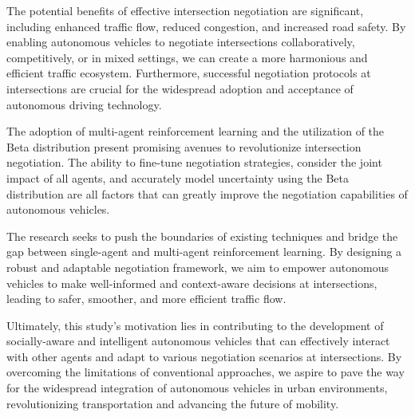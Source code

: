 The potential benefits of effective intersection negotiation are significant, including enhanced traffic flow, reduced congestion, and increased road safety.
By enabling autonomous vehicles to negotiate intersections collaboratively, competitively, or in mixed settings, we can create a more harmonious and efficient traffic ecosystem.
Furthermore, successful negotiation protocols at intersections are crucial for the widespread adoption and acceptance of autonomous driving technology.

The adoption of multi-agent reinforcement learning and the utilization of the Beta distribution present promising avenues to revolutionize intersection negotiation.
The ability to fine-tune negotiation strategies, consider the joint impact of all agents, and accurately model uncertainty using the Beta distribution are all factors that can greatly improve the negotiation capabilities of autonomous vehicles.

The research seeks to push the boundaries of existing techniques and bridge the gap between single-agent and multi-agent reinforcement learning.
By designing a robust and adaptable negotiation framework, we aim to empower autonomous vehicles to make well-informed and context-aware decisions at intersections, leading to safer, smoother, and more efficient traffic flow.

Ultimately, this study's motivation lies in contributing to the development of socially-aware and intelligent autonomous vehicles that can effectively interact with other agents and adapt to various negotiation scenarios at intersections.
By overcoming the limitations of conventional approaches, we aspire to pave the way for the widespread integration of autonomous vehicles in urban environments, revolutionizing transportation and advancing the future of mobility.